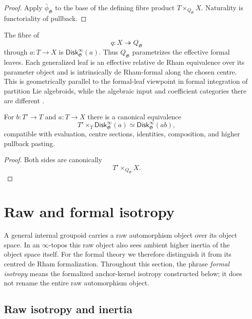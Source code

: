 \begin{proof}
Apply $\bar\phi_{\mathfrak G}$ to the base of the defining fibre product
$T\times_{Q_{\mathfrak G}}X$.  Naturality is functoriality of pullback.
\end{proof}

\begin{remark}
The fibre of
\[
    q:X\twoheadrightarrow Q_{\mathfrak G}
\]
through $a:T\to X$ is $\mathsf{Disk}^{\infty}_{\mathfrak G}(a)$.  Thus
$Q_{\mathfrak G}$ parametrizes the effective formal leaves.  Each generalized
leaf is an effective relative de Rham equivalence over its parameter object
and is intrinsically de Rham-formal along the chosen centre.  This is geometrically
parallel to the formal-leaf viewpoint in formal integration of partition Lie
algebroids, while the algebraic input and coefficient categories there are
different \cite{BrantnerMagidsonNuiten}.
\end{remark}

\begin{proposition}
\label{prop:formal-disk-cartesian}
For $b:T'\to T$ and $a:T\to X$ there is a canonical equivalence
\[
    T'\times_T\mathsf{Disk}^{\infty}_{\mathfrak G}(a)
    \simeq
    \mathsf{Disk}^{\infty}_{\mathfrak G}(ab),
\]
compatible with evaluation, centre sections, identities, composition, and
higher pullback pasting.
\end{proposition}

\begin{proof}
Both sides are canonically
\[
    T'\times_{Q_{\mathfrak G}}X.
\]
\end{proof}


\section{Raw and formal isotropy}
\label{sec:flg-isotropy}

A general internal groupoid carries a raw automorphism object over its object
space.  In an $\infty$-topos this raw object also sees ambient higher inertia
of the object space itself.  For the formal theory we therefore distinguish it
from its centred de Rham formalization.  Throughout this section, the phrase
\emph{formal isotropy} means the formalized anchor-kernel isotropy constructed
below; it does not rename the entire raw automorphism object.

\subsection{Raw isotropy and inertia}


